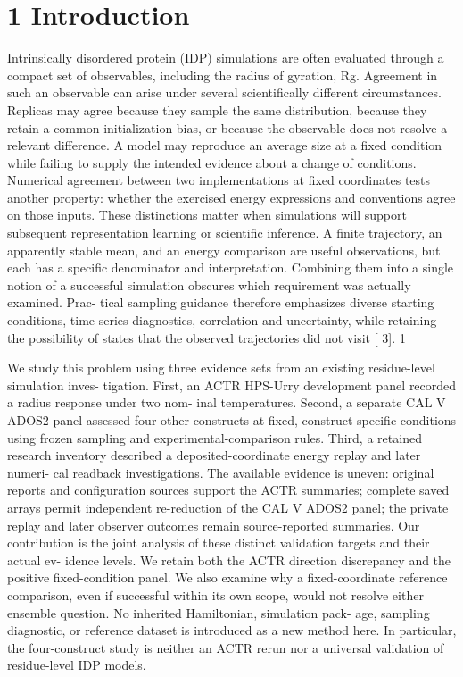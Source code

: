\documentclass[11pt]{article}
\begin{document}
\section*{1 Introduction}

Intrinsically disordered protein (IDP) simulations are often evaluated through a compact set of
observables, including the radius of gyration, Rg. Agreement in such an observable can arise under
several scientifically different circumstances. Replicas may agree because they sample the same
distribution, because they retain a common initialization bias, or because the observable does
not resolve a relevant difference. A model may reproduce an average size at a fixed condition
while failing to supply the intended evidence about a change of conditions. Numerical agreement
between two implementations at fixed coordinates tests another property: whether the exercised
energy expressions and conventions agree on those inputs.
These distinctions matter when simulations will support subsequent representation learning or
scientific inference. A finite trajectory, an apparently stable mean, and an energy comparison are
useful observations, but each has a specific denominator and interpretation. Combining them into
a single notion of a successful simulation obscures which requirement was actually examined. Prac-
tical sampling guidance therefore emphasizes diverse starting conditions, time-series diagnostics,
correlation and uncertainty, while retaining the possibility of states that the observed trajectories
did not visit [ 3].
1

We study this problem using three evidence sets from an existing residue-level simulation inves-
tigation. First, an ACTR HPS-Urry development panel recorded a radius response under two nom-
inal temperatures. Second, a separate CAL V ADOS2 panel assessed four other constructs at fixed,
construct-specific conditions using frozen sampling and experimental-comparison rules. Third,
a retained research inventory described a deposited-coordinate energy replay and later numeri-
cal readback investigations. The available evidence is uneven: original reports and configuration
sources support the ACTR summaries; complete saved arrays permit independent re-reduction of
the CAL V ADOS2 panel; the private replay and later observer outcomes remain source-reported
summaries.
Our contribution is the joint analysis of these distinct validation targets and their actual ev-
idence levels. We retain both the ACTR direction discrepancy and the positive fixed-condition
panel. We also examine why a fixed-coordinate reference comparison, even if successful within its
own scope, would not resolve either ensemble question. No inherited Hamiltonian, simulation pack-
age, sampling diagnostic, or reference dataset is introduced as a new method here. In particular,
the four-construct study is neither an ACTR rerun nor a universal validation of residue-level IDP
models.
\end{document}
